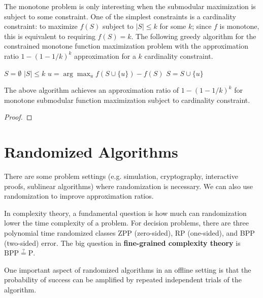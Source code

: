 The monotone problem is only interesting when the submodular maximization is subject to some constraint. One of the simplest constraints is a cardinality constraint: to maximize $f(S)$ subject to $|S| \leq k$ for some $k$; since $f$ is monotone, this is equivalent to requiring $f(S) = k$. The following greedy algorithm for the constrained monotone function maximization problem with the approximation ratio $1 - (1-1/k)^k$ approximation for a $k$ cardinality constraint.

\begin{codebox}
    \li $S = \emptyset$
    \li \While $|S| \leq k$ \Do
        \li $u = \arg\max_u f(S \cup \{u\}) - f(S)$
        \li $S = S \cup \{u\}$
    \End
\end{codebox}

\begin{theorem}
    The above algorithm achieves an approximation ratio of $1 - (1 - 1/k)^k$ for monotone submodular function maximization subject to cardinality constraint.
\end{theorem}

\begin{proof}
    
\end{proof}

\section{Randomized Algorithms}

There are some problem settings (e.g. simulation, cryptography, interactive proofs, sublinear algorithms) where randomization is necessary. We can also use randomization to improve approximation ratios.

In complexity theory, a fundamental question is how much can randomization lower the time complexity of a problem. For decision problems, there are three polynomial time randomized classes ZPP (zero-sided), RP (one-sided), and BPP (two-sided) error. The big question in \textbf{fine-grained complexity theory} is $\mathrm{BPP} \overset{?}{=} \mathrm{P}$.

One important aspect of randomized algorithms in an offline setting is that the probability of success can be amplified by repeated independent trials of the algorithm.

